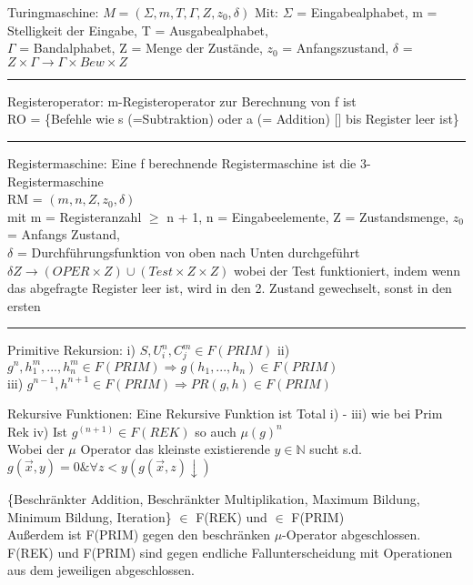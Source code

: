 \documentclass[10pt,a4paper]{article} %
\begin{document}
	Turingmaschine: $M = (\Sigma, m, T, \Gamma, Z, z_0, \delta)$ Mit: $\Sigma$ = Eingabealphabet, m = Stelligkeit der Eingabe, T = Ausgabealphabet, \\
	$\Gamma$ = Bandalphabet, Z = Menge der Zustände, $z_0$ = Anfangszustand, $\delta$ = $Z \times \Gamma \rightarrow \Gamma \times Bew \times Z$
	
	\rule{0.5\paperwidth}{0.5pt}
	
	Registeroperator: m-Registeroperator zur Berechnung von f ist \\
	RO = \{Befehle wie s (=Subtraktion) oder a (= Addition) [] bis Register leer ist\}
	
	\rule{0.5\paperwidth}{0.5pt}
	
	Registermaschine: Eine f berechnende Registermaschine ist die 3-Registermaschine \\
	RM = $(m, n, Z, z_0, \delta)$ \\
	mit m = Registeranzahl $\ge$ n + 1, n = Eingabeelemente, Z = Zustandsmenge, $z_0$ = Anfangs Zustand, \\
	$\delta$ = Durchführungsfunktion von oben nach Unten durchgeführt \\
	$\delta Z \rightarrow (OPER \times Z) \cup (Test \times Z \times Z)$ wobei der Test funktioniert, indem wenn das abgefragte Register leer ist, wird in den 2. Zustand gewechselt, sonst in den ersten  
	
	\rule{0.5\paperwidth}{0.5pt}
	
	Primitive Rekursion: i) $S, U^n_i, C^m_j \in F(PRIM)$ ii) $g^{n}, h^{m}_1, ..., h^{m}_n \in F(PRIM) \Rightarrow g(h_1, ..., h_n) \in F(PRIM)$ \\
	iii) $g^{n - 1}, h^{n + 1} \in F(PRIM) \Rightarrow PR(g, h) \in F(PRIM)$
	
	Rekursive Funktionen: Eine Rekursive Funktion ist Total i) - iii) wie bei Prim Rek iv) Ist $g^{(n + 1)} \in F(REK)$ so auch $\mu(g)^{n}$ \\
	Wobei der $\mu$ Operator das kleinste existierende $y \in \mathbb{N}$ sucht s.d. $g(\overrightarrow{x}, y) = 0 \& \forall z < y (g(\overrightarrow{x}, z) \downarrow)$
	
	\{Beschränkter Addition, Beschränkter Multiplikation, Maximum Bildung, Minimum Bildung, Iteration\} $\in$ F(REK) und $\in$ F(PRIM) \\
	Außerdem ist F(PRIM) gegen den beschränken $\mu$-Operator abgeschlossen. F(REK) und F(PRIM) sind gegen endliche Fallunterscheidung mit Operationen aus dem jeweiligen abgeschlossen. 
	
\end{document}
